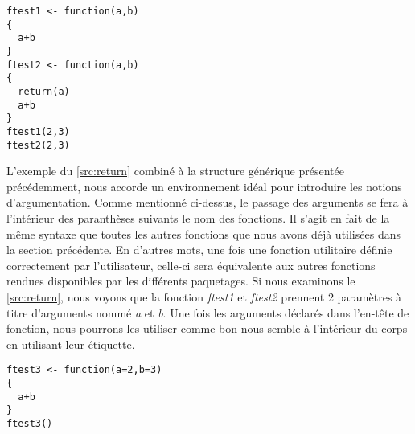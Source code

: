 \begin{lstlisting}[caption = L'instruction \emph{return} et le retour standard d'une fonction R ,label=src:return]
ftest1 <- function(a,b)
{
  a+b
}
ftest2 <- function(a,b)
{
  return(a)
  a+b
}
ftest1(2,3)
ftest2(2,3)
\end{lstlisting}

\vspace{\baselineskip}
\noindent
L'exemple du \autoref{src:return} combiné à la structure générique présentée précédemment, nous accorde un environnement idéal pour introduire les notions d'argumentation. Comme mentionné ci-dessus, le passage des arguments se fera à l'intérieur des paranthèses suivants le nom des fonctions. Il s'agit en fait de la même syntaxe que toutes les autres fonctions que nous avons déjà utilisées dans la section précédente. En d'autres mots, une fois une fonction utilitaire définie correctement par l'utilisateur, celle-ci sera équivalente aux autres fonctions rendues disponibles par les différents paquetages. Si nous examinons le \autoref{src:return}, nous voyons que la fonction \emph{ftest1} et \emph{ftest2} prennent 2 paramètres à titre d'arguments nommé \emph{a} et \emph{b}. Une fois les arguments déclarés dans l'en-tête de fonction, nous pourrons les utiliser comme bon nous semble à l'intérieur du corps en utilisant leur étiquette.

\begin{lstlisting}[caption = Définir des valeurs par défauts dans les fonctions utilitaires,label=src:defaultParams]
ftest3 <- function(a=2,b=3)
{
  a+b
}
ftest3()
\end{lstlisting}

